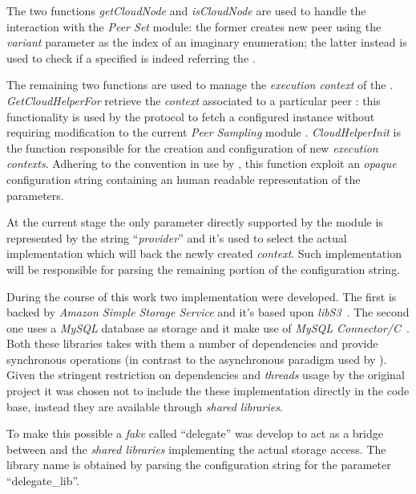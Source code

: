 The two functions \emph{getCloudNode} and \emph{isCloudNode} are used
to handle the interaction with the \textit{Peer Set} module: the
former creates new peer \descriptor using the \textit{variant}
parameter as the index of an imaginary \cloud \descriptor enumeration;
the latter instead is used to check if a specified \descriptor is
indeed referring the \cloud.

The remaining two functions are used to manage the \textit{execution
  context} of the \cloudhelper. \emph{GetCloudHelperFor} retrieve the
\textit{context} associated to a particular peer \descriptor: this
functionality is used by the \cloudcast \peersampling protocol to
fetch a configured \cloudhelper instance without requiring
modification to the current \grapes \textit{Peer Sampling} module
\api. \emph{CloudHelperInit} is the function responsible for the
creation and configuration of new \cloudhelper \textit{execution
  contexts}. Adhering to the convention in use by \grapes, this function
exploit an \textit{opaque} configuration string containing an
human readable representation of the parameters.

At the current stage the only parameter directly supported by the
\cloudhelper module is represented by the string ``\textit{provider}''
and it's used to select the actual implementation which will back the
newly created \textit{context}. Such implementation will be
responsible for parsing the remaining portion of the configuration
string.

During the course of this work two \cloudhelper implementation were
developed. The first is backed by \textit{Amazon Simple Storage
  Service} \cloud and it's based upon \textit{libS3}~\cite{LibS3}. The
second one uses a \textit{MySQL} database as storage and it
make use of \textit{MySQL Connector/C}~\cite{MySQLConnectorC}. Both
these libraries takes with them a number of dependencies and provide
synchronous operations (in contrast to the asynchronous paradigm used
by \grapes). Given the stringent restriction on dependencies and
\textit{threads} usage by the original project it was chosen not to
include the these \cloudhelper implementation directly in the code
base, instead they are available through \textit{shared libraries}.

To make this possible a \textit{fake} \cloudhelper called ``delegate''
was develop to act as a bridge between \grapes and the \textit{shared
  libraries} implementing the actual \cloud storage access. The
library name is obtained by parsing the configuration string for the parameter
``delegate\_lib''.

